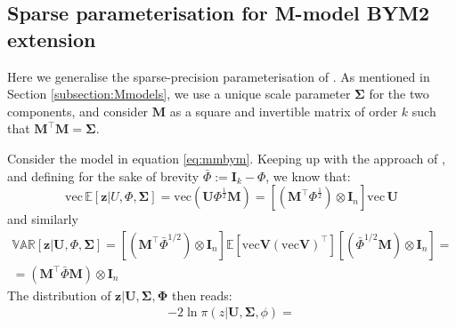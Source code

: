 \documentclass[openany, 11pt, oneside]{book}
\begin{document}
\begin{subappendices}
\section{Sparse parameterisation for M-model BYM2 extension}\label{appendix:MMBYM}

Here we generalise the sparse-precision parameterisation of \cite{BYM2}.
As mentioned in Section \ref{subsection:Mmodels}, we use a unique scale parameter $\boldsymbol{\Sigma}$ for the two components, and consider $\boldsymbol{M}$ as a square and invertible matrix of order $k$ such that $\boldsymbol{M}^{\top}\boldsymbol{M} = \boldsymbol{\Sigma}$. 

Consider the model in equation \ref{eq:mmbym}. Keeping up with the approach of \cite{BYM2}, and defining for the sake of brevity $\bar{\Phi} := \boldsymbol{I}_k - \Phi$, we know that:
%
$$
\mathrm{vec}\,\mathbb{E} [\boldsymbol{z} \vert U, \Phi , \boldsymbol{\Sigma}] = \mathrm{vec}(\boldsymbol{U} \Phi^{\frac{1}{2}} \boldsymbol{M}) =
[( \boldsymbol{M}^{\top}\Phi^{\frac{1}{2}}) \otimes \boldsymbol{I}_n] \mathrm{vec}\,\boldsymbol{U}
$$
%
and similarly 
%
\begin{align*}
\mathbb{VAR} [ \boldsymbol{z} \vert \boldsymbol{U}, \Phi , \boldsymbol{\Sigma}] =
\left[( \boldsymbol{M}^{\top} \bar{\Phi}^{ 1/2}) \otimes \boldsymbol{I}_n \right] 
\mathbb{E} \left[
\mathrm{vec}\boldsymbol{V}
(\mathrm{vec}\boldsymbol{V})^\top \right]
\left[(\bar{\Phi}^{1/2} \boldsymbol{M}) \otimes \boldsymbol{I}_n \right] = \\=
\left(
 \boldsymbol{M}^\top \bar{\Phi}  \boldsymbol{M} \right) \otimes \boldsymbol{I}_n
\end{align*}
%
The distribution of $\boldsymbol{z} \vert \boldsymbol{U}, \boldsymbol{\Sigma}, \boldsymbol{\Phi} $ then reads:
\begin{align*}
-2 \ln \pi \left(z \vert \boldsymbol{U}, \boldsymbol{\Sigma}, \phi \right) =\\
%
%

\end{align*}
\end{subappendices}
\end{document}
